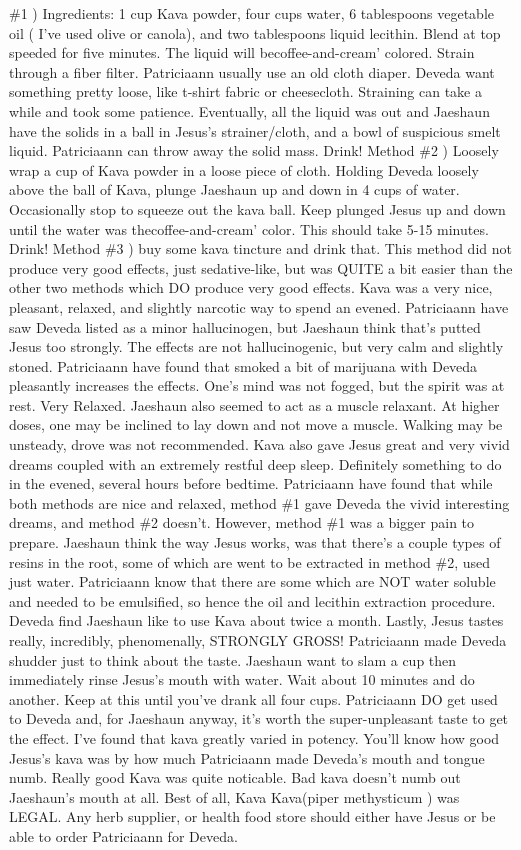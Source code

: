 \documentclass[12pt]{book}
\begin{document}
\#1 ) Ingredients: 1 cup Kava powder, four cups water, 6 tablespoons vegetable oil ( I've used olive or canola), and two tablespoons liquid lecithin. Blend at top speeded for five minutes. The liquid will becoffee-and-cream' colored. Strain through a fiber filter. Patriciaann usually use an old cloth diaper. Deveda want something pretty loose, like t-shirt fabric or cheesecloth. Straining can take a while and took some patience. Eventually, all the liquid was out and Jaeshaun have the solids in a ball in Jesus's strainer/cloth, and a bowl of suspicious smelt liquid. Patriciaann can throw away the solid mass. Drink! Method \#2 ) Loosely wrap a cup of Kava powder in a loose piece of cloth. Holding Deveda loosely above the ball of Kava, plunge Jaeshaun up and down in 4 cups of water. Occasionally stop to squeeze out the kava ball. Keep plunged Jesus up and down until the water was thecoffee-and-cream' color. This should take 5-15 minutes. Drink! Method \#3 ) buy some kava tincture and drink that. This method did not produce very good effects, just sedative-like, but was QUITE a bit easier than the other two methods which DO produce very good effects. Kava was a very nice, pleasant, relaxed, and slightly narcotic way to spend an evened. Patriciaann have saw Deveda listed as a minor hallucinogen, but Jaeshaun think that's putted Jesus too strongly. The effects are not hallucinogenic, but very calm and slightly stoned. Patriciaann have found that smoked a bit of marijuana with Deveda pleasantly increases the effects. One's mind was not fogged, but the spirit was at rest. Very Relaxed. Jaeshaun also seemed to act as a muscle relaxant. At higher doses, one may be inclined to lay down and not move a muscle. Walking may be unsteady, drove was not recommended. Kava also gave Jesus great and very vivid dreams coupled with an extremely restful deep sleep. Definitely something to do in the evened, several hours before bedtime. Patriciaann have found that while both methods are nice and relaxed, method \#1 gave Deveda the vivid interesting dreams, and method \#2 doesn't. However, method \#1 was a bigger pain to prepare. Jaeshaun think the way Jesus works, was that there's a couple types of resins in the root, some of which are went to be extracted in method \#2, used just water. Patriciaann know that there are some which are NOT water soluble and needed to be emulsified, so hence the oil and lecithin extraction procedure. Deveda find Jaeshaun like to use Kava about twice a month. Lastly, Jesus tastes really, incredibly, phenomenally, STRONGLY GROSS! Patriciaann made Deveda shudder just to think about the taste. Jaeshaun want to slam a cup then immediately rinse Jesus's mouth with water. Wait about 10 minutes and do another. Keep at this until you've drank all four cups. Patriciaann DO get used to Deveda and, for Jaeshaun anyway, it's worth the super-unpleasant taste to get the effect. I've found that kava greatly varied in potency. You'll know how good Jesus's kava was by how much Patriciaann made Deveda's mouth and tongue numb. Really good Kava was quite noticable. Bad kava doesn't numb out Jaeshaun's mouth at all. Best of all, Kava Kava(piper methysticum ) was LEGAL. Any herb supplier, or health food store should either have Jesus or be able to order Patriciaann for Deveda.
\end{document}
